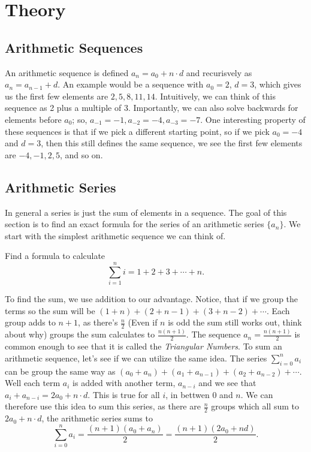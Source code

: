 \documentclass[11pt]{article}
\begin{document}
\section{Theory}

\subsection{Arithmetic Sequences}
An arithmetic sequence is defined $a_n = a_0 + n \cdot d$ and recurisvely as $a_n = a_{n-1} + d$. An example would be a sequence with $a_0 = 2$, $d=3$, which gives us the first few elements are $2, 5, 8, 11, 14$. Intuitively, we can think of this sequence as 2 plus a multiple of 3. Importantly, we can also solve backwards for elements before $a_0$; so, $a_{-1} = -1, a_{-2} = -4, a_{-3} = -7$. One interesting property of these sequences is that if we pick a different starting point, so if we pick $a_0 = -4$ and $d=3$, then this still defines the same sequence, we see the first few elements are $-4, -1, 2, 5$, and so on.  

\subsection*{Arithmetic Series}
In general a series is just the sum of elements in a sequence. The goal of this section is to find an exact formula for the series of an arithmetic series $\{a_n\}$. We start with the simplest arithmetic sequence we can think of.
\begin{example}
Find a formula to calculate
\[
    \sum_{i=1}^n i = 1 + 2 + 3 + \cdots  + n.
\]
\end{example}
To find the sum, we use addition to our advantage. Notice, that if we group the terms so the sum will be $(1+n) + (2 + n-1) + (3+ n - 2) + \cdots $. Each group adds to $n+1$, as there's $\frac{n}{2}$ (Even if $n$ is odd the sum still works out, think about why) groups the sum calculates to $\frac{n(n+1)}{2}$. The sequence $a_n = \frac{n(n+1)}{2}$ is common enough to see that it is called the \textit{Triangular Numbers}. To sum an arithmetic sequence, let's see if we can utilize the same idea. 
The series $\sum_{i=0}^n a_i$ can be group the same way as $(a_0 + a_n) + (a_1 + a_{n-1}) + (a_2+a_{n-2}) + \cdots$. Well each term $a_i$ is added with another term, $a_{n-i}$ and we see that $a_i + a_{n-i} = 2a_0 + n \cdot d$. This is true for all $i$, in bettwen $0$ and $n$. We can therefore use this idea to sum this series, as there are $\frac{n}{2}$ groups which all sum to $2a_0 + n \cdot d$, the arithmetic series sums to 
\[
\sum_{i=0}^n a_i = \frac{(n+1)(a_0 + a_n)}{2} = \frac{(n+1)(2a_0 + n d)}{2}.
\]
\end{document}
